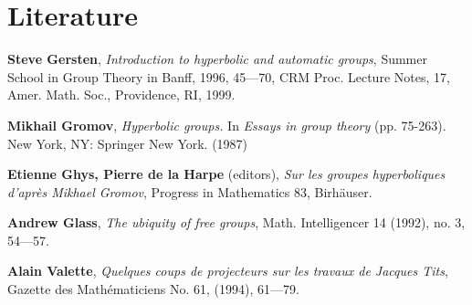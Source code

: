 \documentclass{amsart}
\begin{document}
\section{Literature}
\noindent
\textbf{Steve Gersten}, \textit{Introduction to hyperbolic and automatic groups}, Summer School in Group Theory in Banff, 1996, 45—70, CRM Proc. Lecture Notes, 17, Amer. Math. Soc., Providence, RI, 1999.
\medskip

\noindent
\textbf{Mikhail Gromov},  \textit{Hyperbolic groups.} In
\textit{Essays in group theory} (pp. 75-263). New York, NY: Springer
New York. (1987) 
\medskip

\noindent
\textbf{Etienne Ghys, Pierre de la Harpe} (editors), \textit{Sur les
  groupes hyperboliques d’apr\`es Mikhael Gromov}, Progress in
Mathematics 83, Birhäuser.
\medskip

\noindent
\textbf{Andrew Glass}, \textit{The ubiquity of free groups},
Math. Intelligencer 14 (1992), no. 3, 54—57.
\medskip

\noindent
\textbf{Alain Valette}, \textit{Quelques coups de projecteurs sur les
  travaux de Jacques Tits}, Gazette des Mathématiciens No. 61, (1994),
61—79.
\end{document}
